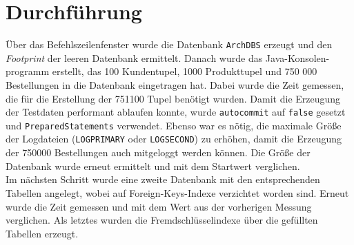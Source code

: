 \chapter{Durchführung}
Über das Befehlszeilenfenster wurde die Datenbank \texttt{ArchDBS} erzeugt und den \textit{Footprint} der leeren Datenbank ermittelt. Danach wurde das Java-Konsolen-programm erstellt, das 100 Kundentupel, 1000 Produkttupel und 750 000 Bestellungen in die Datenbank eingetragen hat. Dabei wurde die Zeit gemessen, die für die Erstellung der 751100 Tupel benötigt wurden. Damit die Erzeugung der Testdaten performant ablaufen konnte, wurde \texttt{autocommit} auf \texttt{false} gesetzt und \texttt{PreparedStatements} verwendet. Ebenso war es nötig, die maximale Größe der Logdateien (\texttt{LOGPRIMARY} oder \texttt{LOGSECOND}) zu erhöhen, damit die Erzeugung der 750000 Bestellungen auch mitgeloggt werden können. Die Größe der Datenbank wurde erneut ermittelt und mit dem Startwert verglichen.\\

Im nächsten Schritt wurde eine zweite Datenbank mit den entsprechenden Tabellen angelegt, wobei auf Foreign-Keys-Indexe verzichtet worden sind. Erneut wurde die Zeit gemessen und mit dem Wert aus der vorherigen Messung verglichen. Als letztes wurden die Fremdschlüsselindexe über die gefüllten Tabellen erzeugt. 